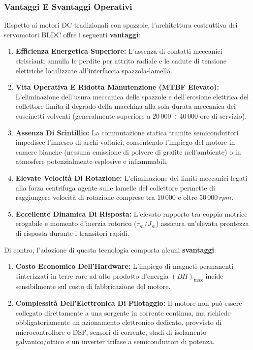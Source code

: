﻿\documentclass[11pt, a4paper]{article}
\begin{document}
\subsubsection{Vantaggi E Svantaggi Operativi}
Rispetto ai motori DC tradizionali con spazzole, l'architettura costruttiva dei servomotori BLDC offre i seguenti \textbf{vantaggi}:
\begin{enumerate}
    \item \textbf{Efficienza Energetica Superiore:} L'assenza di contatti meccanici striscianti annulla le perdite per attrito radiale e le cadute di tensione elettriche localizzate all'interfaccia spazzola-lamella.
    \item \textbf{Vita Operativa E Ridotta Manutenzione (MTBF Elevato):} L'eliminazione dell'usura meccanica delle spazzole e dell'erosione elettrica del collettore limita il degrado della macchina alla sola durata meccanica dei cuscinetti volventi (generalmente superiore a $20\,000 \div 40\,000$ ore di servizio).
    \item \textbf{Assenza Di Scintillio:} La commutazione statica tramite semiconduttori impedisce l'innesco di archi voltaici, consentendo l'impiego del motore in camere bianche (nessuna emissione di polvere di grafite nell'ambiente) o in atmosfere potenzialmente esplosive e infiammabili.
    \item \textbf{Elevate Velocità Di Rotazione:} L'eliminazione dei limiti meccanici legati alla forza centrifuga agente sulle lamelle del collettore permette di raggiungere velocità di rotazione comprese tra $10\,000$ e oltre $50\,000\,\si{rpm}$.
    \item \textbf{Eccellente Dinamica Di Risposta:} L'elevato rapporto tra coppia motrice erogabile e momento d'inerzia rotorico ($\tau_m / J_m$) assicura un'elevata prontezza di risposta durante i transitori rapidi.
\end{enumerate}

Di contro, l'adozione di questa tecnologia comporta alcuni \textbf{svantaggi}:
\begin{enumerate}
    \item \textbf{Costo Economico Dell'Hardware:} L'impiego di magneti permanenti sinterizzati in terre rare ad alto prodotto d'energia $(BH)_{\max}$ incide sensibilmente sul costo di fabbricazione del motore.
    \item \textbf{Complessità Dell'Elettronica Di Pilotaggio:} Il motore non può essere collegato direttamente a una sorgente in corrente continua, ma richiede obbligatoriamente un azionamento elettronico dedicato, provvisto di microcontrollore o DSP, sensori di corrente, stadi di isolamento galvanico/ottico e un inverter trifase a semiconduttori di potenza.
\end{enumerate}
\newpage
\end{document}
